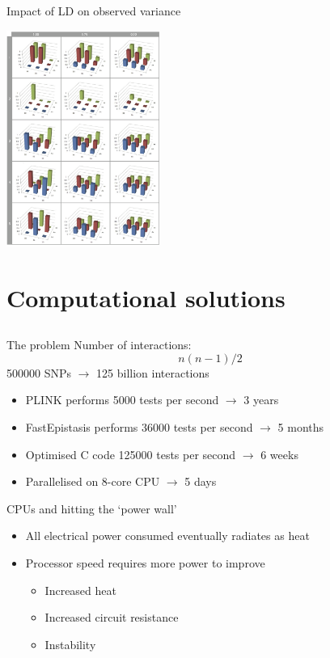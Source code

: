 \documentclass{beamer}
\begin{document}
\begin{frame}{Impact of LD on observed variance}
\begin{center}
\includegraphics[width=5cm]{gpmaps_ld.png} \\
\end{center}
\end{frame}

\section{Computational solutions}
\subsection{}

\begin{frame}{The problem}
Number of interactions: \\
\begin{equation}
n(n-1) / 2 \nonumber
\end{equation}
500000 SNPs $\rightarrow$ 125 billion interactions \\
\begin{itemize}
\item PLINK performs 5000 tests per second $\rightarrow$ 3 years
\item FastEpistasis performs 36000 tests per second $\rightarrow$ 5 months
\item Optimised C code 125000 tests per second $\rightarrow$ 6 weeks
\item Parallelised on 8-core CPU $\rightarrow$ 5 days
\end{itemize}
\end{frame}


\begin{frame}{CPUs and hitting the `power wall'}
\begin{itemize}
\item All electrical power consumed eventually radiates as heat
\item Processor speed requires more power to improve
\begin{itemize}
\item Increased heat
\item Increased circuit resistance
\item Instability
\end{itemize}
\end{itemize}
\end{frame}
\end{document}
